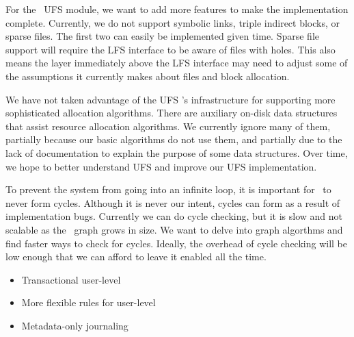 For the \Kudos\ UFS module, we want to add more features to make the
implementation complete. Currently, we do not support symbolic links, triple
indirect blocks, or sparse files. The first two can easily be implemented
given time. Sparse file support will require the LFS interface to be aware of
files with holes. This also means the layer immediately above the LFS interface
may need to adjust some of the assumptions it currently makes about files and
block allocation.

We have not taken advantage of the UFS \module's infrastructure for supporting
more sophisticated allocation algorithms. There are auxiliary on-disk data
structures that assist resource allocation algorithms. We currently ignore many
of them, partially because our basic algorithms do not use them, and partially
due to the lack of documentation to explain the purpose of some data
structures. Over time, we hope to better understand UFS and improve our UFS
implementation.

To prevent the system from going into an infinite loop, it is important for
\chdescs\ to never form cycles. Although it is never our intent, cycles can
form as a result of implementation bugs. Currently we can do cycle checking,
but it is slow and not scalable as the \chdesc\ graph grows in size. We want to
delve into graph algorthms and find faster ways to check for cycles. Ideally,
the overhead of cycle checking will be low enough that we can afford to leave
it enabled all the time.

\begin{itemize}
\item Transactional user-level \chdescs
\item More flexible rules for user-level \chdescs
\item Metadata-only journaling
\end{itemize}
